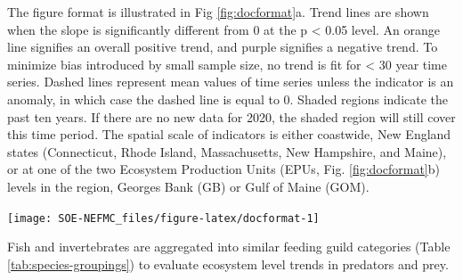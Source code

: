 \documentclass[
  10pt,
]{article}
\let\origfigure\figure
\let\endorigfigure\endfigure
\renewenvironment{figure}[1][2] {
    \expandafter\origfigure\expandafter[H]
} {
    \endorigfigure
}
\begin{document}
The figure format is illustrated in Fig \ref{fig:docformat}a. Trend lines are shown when the slope is significantly different from 0 at the p \textless{} 0.05 level. An orange line signifies an overall positive trend, and purple signifies a negative trend. To minimize bias introduced by small sample size, no trend is fit for \textless{} 30 year time series. Dashed lines represent mean values of time series unless the indicator is an anomaly, in which case the dashed line is equal to 0. Shaded regions indicate the past ten years. If there are no new data for 2020, the shaded region will still cover this time period. The spatial scale of indicators is either coastwide, New England states (Connecticut, Rhode Island, Massachusetts, New Hampshire, and Maine), or at one of the two Ecosystem Production Units (EPUs, Fig. \ref{fig:docformat}b) levels in the region, Georges Bank (GB) or Gulf of Maine (GOM).

\begin{figure}

{\centering \texttt{[image: SOE-NEFMC\_files/figure-latex/docformat-1]} 

}

\caption{Document orientation. a. Key to figures. b.The Northeast Large Marine Ecosystem.}\label{fig:docformat}
\end{figure}

Fish and invertebrates are aggregated into similar feeding guild categories (Table \ref{tab:species-groupings}) to evaluate ecosystem level trends in predators and prey.

\providecommand{\docline}[3]{\noalign{\global\setlength{\arrayrulewidth}{#1}}\arrayrulecolor[HTML]{#2}\cline{#3}}

\setlength{\tabcolsep}{0pt}

\renewcommand*{\arraystretch}{1.5}
\end{document}
